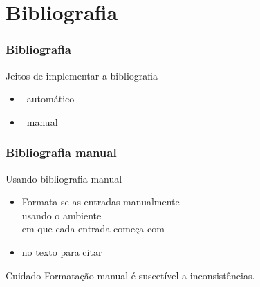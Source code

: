 
\section{Bibliografia}

\begin{frame}
  \frametitle{Bibliografia}

  \begin{block}{Jeitos de implementar a bibliografia}
    \begin{itemize}
    \item \vantagem\ automático
    \item \desvantagem\ manual

    \end{itemize}

  \end{block}
\end{frame}

\begin{frame}
  \frametitle{Bibliografia manual}

  \begin{block}{Usando bibliografia manual \leftthumbsdown}
    \begin{itemize}
    \item Formata-se as entradas manualmente\\
      usando o ambiente \\
      em que cada entrada começa com
      \texttt{\green{\string\bibitem}}\medskip
    \item \texttt{\blue{\string\cite}} no
      texto para citar
    \end{itemize}
  \end{block}

  \begin{alertblock}{Cuidado}
    Formatação manual é suscetível a inconsistências.
  \end{alertblock}
\end{frame}

